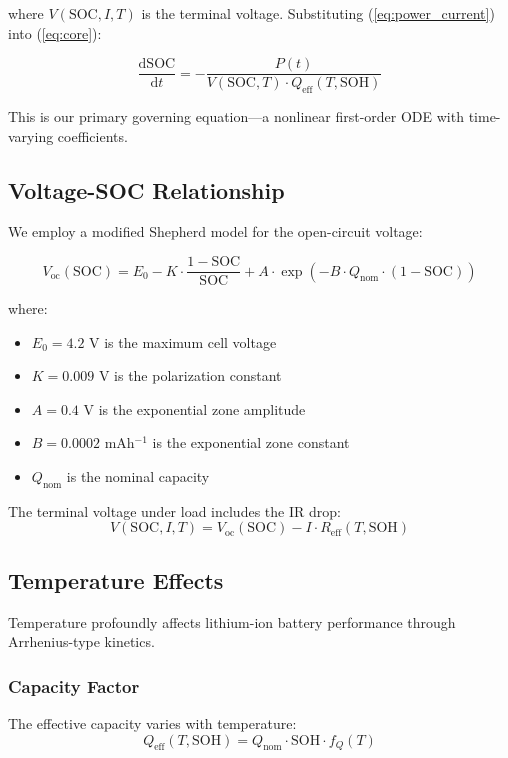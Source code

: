 \documentclass[12pt]{article}
\newcommand{\dd}{\mathrm{d}}
\newcommand{\SOC}{\text{SOC}}
\newcommand{\SOH}{\text{SOH}}
\begin{document}
where $V(\SOC, I, T)$ is the terminal voltage. Substituting (\ref{eq:power_current}) into (\ref{eq:core}):

\begin{equation}
\boxed{
\frac{\dd\SOC}{\dd t} = -\frac{P(t)}{V(\SOC, T) \cdot Q_{\text{eff}}(T, \SOH)}
}
\label{eq:main}
\end{equation}

This is our primary governing equation—a nonlinear first-order ODE with time-varying coefficients.

\subsection{Voltage-SOC Relationship}

We employ a modified Shepherd model for the open-circuit voltage:

\begin{equation}
V_{\text{oc}}(\SOC) = E_0 - K \cdot \frac{1 - \SOC}{\SOC} + A \cdot \exp\left(-B \cdot Q_{\text{nom}} \cdot (1 - \SOC)\right)
\label{eq:voc}
\end{equation}

where:
\begin{itemize}
    \item $E_0 = 4.2$ V is the maximum cell voltage
    \item $K = 0.009$ V is the polarization constant
    \item $A = 0.4$ V is the exponential zone amplitude
    \item $B = 0.0002$ mAh$^{-1}$ is the exponential zone constant
    \item $Q_{\text{nom}}$ is the nominal capacity
\end{itemize}

The terminal voltage under load includes the IR drop:
\begin{equation}
V(\SOC, I, T) = V_{\text{oc}}(\SOC) - I \cdot R_{\text{eff}}(T, \SOH)
\label{eq:vterminal}
\end{equation}

\subsection{Temperature Effects}

Temperature profoundly affects lithium-ion battery performance through Arrhenius-type kinetics.

\subsubsection{Capacity Factor}
The effective capacity varies with temperature:
\begin{equation}
Q_{\text{eff}}(T, \SOH) = Q_{\text{nom}} \cdot \SOH \cdot f_Q(T)
\label{eq:qeff}
\end{equation}
\end{document}
